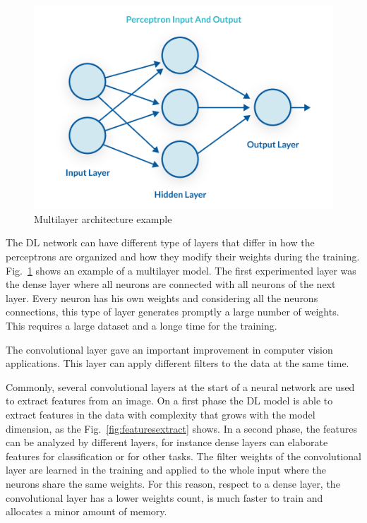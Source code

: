 \documentclass[12pt]{report}
\begin{document}
\begin{figure}[t]
    \centering
    \includegraphics[scale=.5]{multilayer-perceptron.png}
    \caption{Multilayer architecture example \cite{percepimage}}
    \label{fig:multilayer}
\end{figure}

The DL network can have different type of layers that differ in how the perceptrons are organized and 
how they modify their weights during the training. 
Fig.~\ref{fig:multilayer} shows an example of a multilayer model.
The first experimented layer was the dense layer where all neurons are connected
with all neurons of the next layer. Every neuron has his own weights
and considering all the neurons connections, this type of layer generates promptly a large number of weights.
This requires a large
dataset and a longe time for the training. 

The convolutional layer gave an important improvement in computer vision applications. This layer can apply different filters to the data at the same time.

Commonly, several convolutional layers at the start of a neural network are used to extract features from an image. 
On a first phase the DL model is able to extract features in the data with complexity that grows with the model dimension, as the Fig.~\ref{fig:featuresextract} shows.
In a second phase, the features can be analyzed by different layers, for instance dense layers can elaborate features for classification or for other tasks.
The filter weights of the convolutional layer are learned in the training and applied to the whole input where the neurons share the same weights. 
For this reason, respect to a dense layer, the convolutional layer has a lower weights count, is much faster to train and allocates a minor amount of memory.
\end{document}

